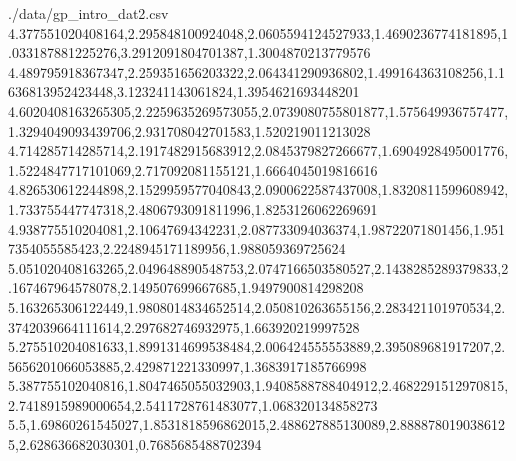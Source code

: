 \begin{filecontents*}{./data/gp_intro_dat2.csv}
    4.377551020408164,2.295848100924048,2.0605594124527933,1.4690236774181895,1.033187881225276,3.2912091804701387,1.3004870213779576
    4.489795918367347,2.259351656203322,2.064341290936802,1.499164363108256,1.1636813952423448,3.123241143061824,1.3954621693448201
    4.6020408163265305,2.2259635269573055,2.0739080755801877,1.575649936757477,1.3294049093439706,2.931708042701583,1.520219011213028
    4.714285714285714,2.1917482915683912,2.0845379827266677,1.6904928495001776,1.5224847717101069,2.717092081155121,1.6664045019816616
    4.826530612244898,2.1529959577040843,2.0900622587437008,1.8320811599608942,1.733755447747318,2.4806793091811996,1.8253126062269691
    4.938775510204081,2.10647694342231,2.087733094036374,1.98722071801456,1.9517354055585423,2.2248945171189956,1.988059369725624
    5.051020408163265,2.049648890548753,2.0747166503580527,2.1438285289379833,2.167467964578078,2.149507699667685,1.9497900814298208
    5.163265306122449,1.9808014834652514,2.050810263655156,2.283421101970534,2.3742039664111614,2.297682746932975,1.663920219997528
    5.275510204081633,1.8991314699538484,2.006424555553889,2.395089681917207,2.5656201066053885,2.429871221330997,1.3683917185766998
    5.387755102040816,1.8047465055032903,1.9408588788404912,2.4682291512970815,2.7418915989000654,2.5411728761483077,1.068320134858273
    5.5,1.69860261545027,1.8531818596862015,2.488627885130089,2.8888780190386125,2.628636682030301,0.7685685488702394
\end{filecontents*}

